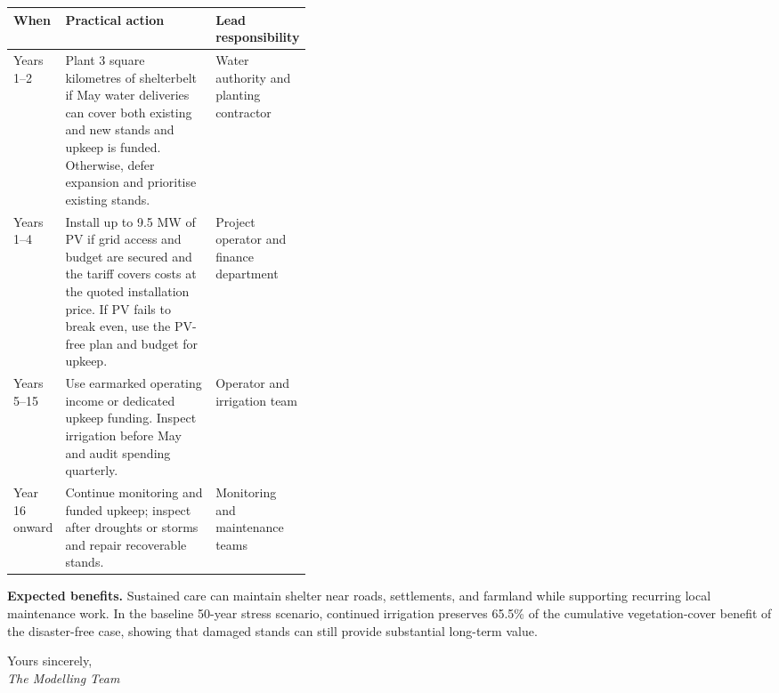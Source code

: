 \vspace{2pt}
\begingroup\footnotesize
\setlength{\tabcolsep}{4pt}\renewcommand{\arraystretch}{1.18}
\begin{tabularx}{\linewidth}{@{}>{\raggedright\arraybackslash}p{0.16\linewidth} >{\raggedright\arraybackslash}X >{\raggedright\arraybackslash}p{0.23\linewidth}@{}}
\toprule
\textbf{When} & \textbf{Practical action} & \textbf{Lead responsibility} \\
\midrule
Years 1--2 & Plant 3 square kilometres of shelterbelt if May water deliveries can cover both existing and new stands and upkeep is funded. Otherwise, defer expansion and prioritise existing stands. & Water authority and planting contractor \\
Years 1--4 & Install up to 9.5 MW of PV if grid access and budget are secured and the tariff covers costs at the quoted installation price. If PV fails to break even, use the PV-free plan and budget for upkeep. & Project operator and finance department \\
Years 5--15 & Use earmarked operating income or dedicated upkeep funding. Inspect irrigation before May and audit spending quarterly. & Operator and irrigation team \\
Year 16 onward & Continue monitoring and funded upkeep; inspect after droughts or storms and repair recoverable stands. & Monitoring and maintenance teams \\
\bottomrule
\end{tabularx}
\endgroup\par
\textbf{Expected benefits.} Sustained care can maintain shelter near roads, settlements, and farmland while supporting recurring local maintenance work. In the baseline 50-year stress scenario, continued irrigation preserves 65.5\% of the cumulative vegetation-cover benefit of the disaster-free case, showing that damaged stands can still provide substantial long-term value.\par
\vspace{2pt}
Yours sincerely,\\
\textit{The Modelling Team}
\par\endgroup
\clearpage
